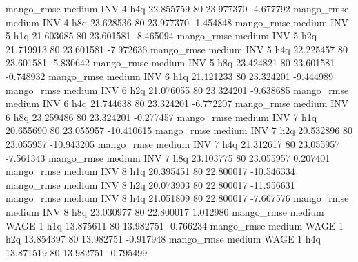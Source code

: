       mango_rmse     medium      INV                 4                  h4q 22.855759 80      23.977370          -4.677792
       mango_rmse     medium      INV                 4                  h8q 23.628536 80      23.977370          -1.454848
       mango_rmse     medium      INV                 5                  h1q 21.603685 80      23.601581          -8.465094
       mango_rmse     medium      INV                 5                  h2q 21.719913 80      23.601581          -7.972636
       mango_rmse     medium      INV                 5                  h4q 22.225457 80      23.601581          -5.830642
       mango_rmse     medium      INV                 5                  h8q 23.424821 80      23.601581          -0.748932
       mango_rmse     medium      INV                 6                  h1q 21.121233 80      23.324201          -9.444989
       mango_rmse     medium      INV                 6                  h2q 21.076055 80      23.324201          -9.638685
       mango_rmse     medium      INV                 6                  h4q 21.744638 80      23.324201          -6.772207
       mango_rmse     medium      INV                 6                  h8q 23.259486 80      23.324201          -0.277457
       mango_rmse     medium      INV                 7                  h1q 20.655690 80      23.055957         -10.410615
       mango_rmse     medium      INV                 7                  h2q 20.532896 80      23.055957         -10.943205
       mango_rmse     medium      INV                 7                  h4q 21.312617 80      23.055957          -7.561343
       mango_rmse     medium      INV                 7                  h8q 23.103775 80      23.055957           0.207401
       mango_rmse     medium      INV                 8                  h1q 20.395451 80      22.800017         -10.546334
       mango_rmse     medium      INV                 8                  h2q 20.073903 80      22.800017         -11.956631
       mango_rmse     medium      INV                 8                  h4q 21.051809 80      22.800017          -7.667576
       mango_rmse     medium      INV                 8                  h8q 23.030977 80      22.800017           1.012980
       mango_rmse     medium     WAGE                 1                  h1q 13.875611 80      13.982751          -0.766234
       mango_rmse     medium     WAGE                 1                  h2q 13.854397 80      13.982751          -0.917948
       mango_rmse     medium     WAGE                 1                  h4q 13.871519 80      13.982751          -0.795499
